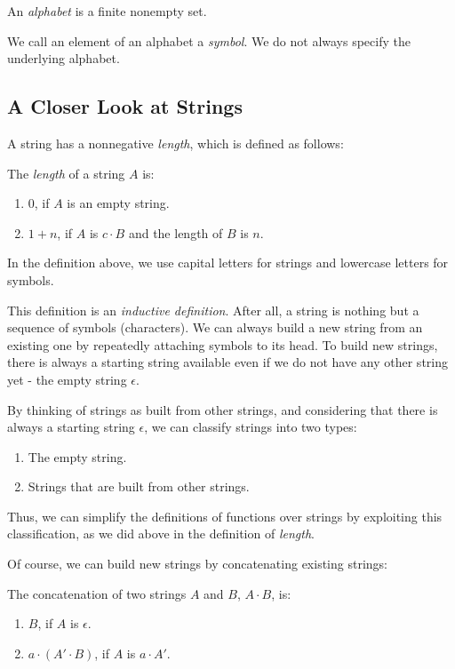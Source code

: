 \documentclass[11pt]{article}
\begin{document}
\begin{definition}
An \emph{alphabet} is a finite nonempty set.
\end{definition}

We call an element of an alphabet a \emph{symbol}. We do not always specify the underlying alphabet.

\subsection{A Closer Look at Strings} \label{subsec:1.3}

A string has a nonnegative \emph{length}, which is defined as follows:
\begin{definition}
The \emph{length} of a string $A$ is:
\begin{enumerate}
\item $0$, if $A$ is an empty string.
\item $1 + n$, if $A$ is $c \cdot B$ and the length of $B$ is $n$.
\end{enumerate}
\end{definition}

In the definition above, we use capital letters for strings and lowercase letters for symbols.

This definition is an \emph{inductive definition}. After all, a string is nothing but a sequence of symbols (characters). We can always build a new string from an existing one by repeatedly attaching symbols to its head. To build new strings, there is always a starting string available even if we do not have any other string yet - the empty string $\epsilon$.

By thinking of strings as built from other strings, and considering that there is always a starting string $\epsilon$, we can classify strings into two types:
\begin{enumerate}
\item The empty string.
\item Strings that are built from other strings.
\end{enumerate}

Thus, we can simplify the definitions of functions over strings by exploiting this classification, as we did above in the definition of \emph{length}.

Of course, we can build new strings by concatenating existing strings:
\begin{definition}
The concatenation of two strings $A$ and $B$, $A \cdot B$, is:
\begin{enumerate}
\item $B$, if $A$ is $\epsilon$.
\item $a \cdot (A' \cdot B)$, if $A$ is $a \cdot A'$.
\end{enumerate}
\end{definition}
\end{document}
